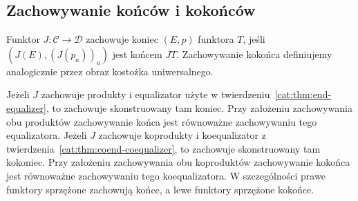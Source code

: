 \subsection{Zachowywanie końców i kokońców}
\begin{definicja}\label{cat:def:end-preservation}
Funktor $J:\mathcal C\to\mathcal D$ zachowuje koniec $(E,p)$ funktora $T$, jeśli $(J(E),(J(p_a))_a)$ jest końcem $JT$. Zachowywanie kokońca definiujemy analogicznie przez obraz kostożka uniwersalnego.
\end{definicja}
\begin{stwierdzenie}\label{cat:prop:end-preservation}
Jeżeli $J$ zachowuje produkty i equalizator użyte w twierdzeniu~\ref{cat:thm:end-equalizer}, to zachowuje skonstruowany tam koniec. Przy założeniu zachowywania obu produktów zachowywanie końca jest równoważne zachowywaniu tego equalizatora. Jeżeli $J$ zachowuje koprodukty i koequalizator z twierdzenia~\ref{cat:thm:coend-coequalizer}, to zachowuje skonstruowany tam kokoniec. Przy założeniu zachowywania obu koproduktów zachowywanie kokońca jest równoważne zachowywaniu tego koequalizatora. W szczególności prawe funktory sprzężone zachowują końce, a lewe funktory sprzężone kokońce.
\end{stwierdzenie}
